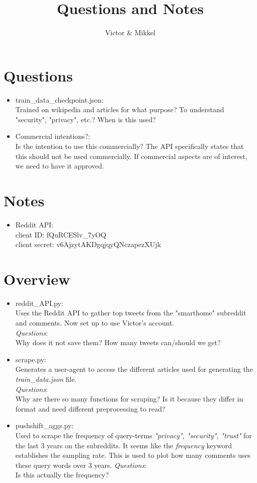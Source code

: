 \documentclass{article}
\begin{document}
\title{Questions and Notes}
\author{Victor \& Mikkel}

\maketitle

\section{Questions}
\begin{itemize}
	\item train\_data\_checkpoint.json:\\
	Trained on wikipedia and articles for what purpose?
	To understand "security", "privacy", etc.?
	When is this used?
	\item Commercial intentions?:\\
	Is the intention to use this commercially? 
	The API specifically states that this should not be used commercially. 
	If commercial aspects are of interest, we need to have it approved.
	

\end{itemize}

\section{Notes}
\begin{itemize}
	\item Reddit API:\\
	client ID: fQuRCESlv\_7yOQ\\
	client secret: v6AjzytAKDgqjqyQNczapezXUjk
\end{itemize}

\section{Overview}
\begin{itemize}
	\item reddit\_API.py:\\
	Uses the Reddit API to gather top tweets
	from the "smarthome" subreddit and comments.
	Now set up to use Victor's account.\\
	\emph{Questions}: \\ Why does it not save them?
	How many tweets can/should we get?
	\item scrape.py:\\
	Generates a user-agent to access the different 
	articles used for generating the \textit{train\_data.json} file.\\
	\emph{Questions}: \\ 
	Why are there so many functions for scraping? 
	Is it because they differ in format and need different preprocessing to read?
	\item pushshift\_aggs.py:\\
	Used to scrape the frequency of query-terms 
	\textit{"privacy", "security", "trust"} for the last 3 years on the subreddits. 
	It seems like the \textit{frequency} keyword establishes the sampling rate.
	This is used to plot how many comments uses these query words over 3 years.
	\emph{Questions}: \\ 
	Is this actually the frequency?
\end{itemize}
\end{document}

